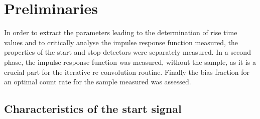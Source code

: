 
\section{Preliminaries}

In order to extract the parameters leading to the determination of rise time values and to critically analyse the impulse response function measured, the properties of the start and stop detectors were separately measured. 
In a second phase, the impulse response function was measured, without the sample, as it is a crucial part for the iterative re convolution routine.
Finally the bias fraction for an optimal count rate for the sample measured was assessed.

\subsection{Characteristics of the start signal}

